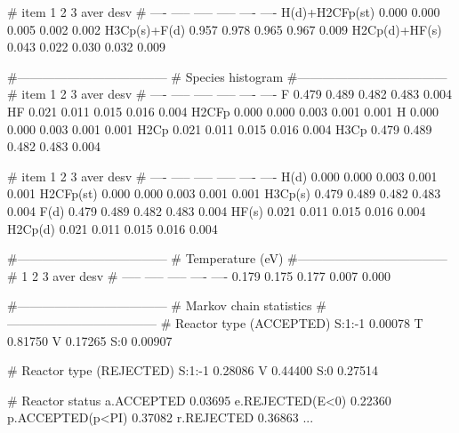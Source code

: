 \documentclass[a4paper,12pt]{article}
\begin{document}
\begin{shellexec}
#                   item         1         2         3           aver      desv
#                   ----     -----     -----     -----           ----      ----
          H(d)+H2CFp(st)     0.000     0.000     0.005          0.002     0.002
          H3Cp(s)+F(d)       0.957     0.978     0.965          0.967     0.009
          H2Cp(d)+HF(s)      0.043     0.022     0.030          0.032     0.009
 
#------------------------------------
# Species histogram
#------------------------------------
#          item         1         2         3           aver      desv
#          ----     -----     -----     -----           ----      ----
          F         0.479     0.489     0.482          0.483     0.004
          HF        0.021     0.011     0.015          0.016     0.004
          H2CFp     0.000     0.000     0.003          0.001     0.001
          H         0.000     0.000     0.003          0.001     0.001
          H2Cp      0.021     0.011     0.015          0.016     0.004
          H3Cp      0.479     0.489     0.482          0.483     0.004
 
 
#              item         1         2         3           aver      desv
#              ----     -----     -----     -----           ----      ----
          H(d)          0.000     0.000     0.003          0.001     0.001
          H2CFp(st)     0.000     0.000     0.003          0.001     0.001
          H3Cp(s)       0.479     0.489     0.482          0.483     0.004
          F(d)          0.479     0.489     0.482          0.483     0.004
          HF(s)         0.021     0.011     0.015          0.016     0.004
          H2Cp(d)       0.021     0.011     0.015          0.016     0.004
 
#------------------------------------
# Temperature (eV)
#------------------------------------
#                  1         2         3           aver      desv
#              -----     -----     -----           ----      ----
               0.179     0.175     0.177          0.007     0.000
 
#------------------------------------
# Markov chain statistics
#------------------------------------
# Reactor type (ACCEPTED)
              S:1:-1        0.00078
                   T        0.81750
                   V        0.17265
                 S:0        0.00907
 
# Reactor type (REJECTED)
              S:1:-1        0.28086
                   V        0.44400
                 S:0        0.27514
 
# Reactor status
    a.ACCEPTED              0.03695
    e.REJECTED(E<0)         0.22360
    p.ACCEPTED(p<PI)        0.37082
    r.REJECTED              0.36863
... 
\end{shellexec}
\end{document}
